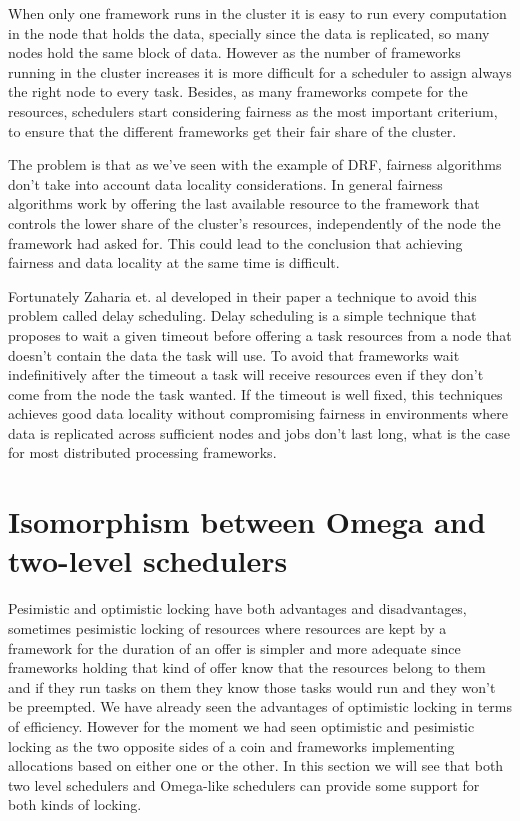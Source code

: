 \documentclass{report}                     %
\begin{document}
When only one framework runs in the cluster it is easy to run every
computation in the node that holds the data, specially since the data
is replicated, so many nodes hold the same block of data. However as
the number of frameworks running in the cluster increases it is more
difficult for a scheduler to assign always the right node to every
task. Besides, as many frameworks compete for the resources, schedulers
start considering fairness as the most important criterium, to ensure
that the different frameworks get their fair share of the cluster.

The problem is that as we've seen with the example of DRF, fairness
algorithms don't take into account data locality considerations. In
general fairness algorithms work by offering the last available
resource to the framework that controls the lower share of the cluster's
resources, independently of the node the framework had asked for. This
could lead to the conclusion that achieving fairness and data locality
at the same time is difficult.

Fortunately Zaharia et. al developed in their paper
\cite{zaharia_delay_2010} a technique to avoid this problem called
delay scheduling. Delay scheduling is a simple technique that proposes
to wait a given timeout before offering a task resources from a node
that doesn't contain the data the task will use. To avoid that
frameworks wait indefinitively after the timeout a task will receive
resources even if they don't come from the node the task wanted. If
the timeout is well fixed, this techniques achieves good data locality
without compromising fairness in environments where data is replicated
across sufficient nodes and jobs don't last long, what is the case for
most distributed processing frameworks.



\section {Isomorphism between Omega and two-level schedulers}
\label{sec:mixed}

Pesimistic and optimistic locking have both advantages and
disadvantages, sometimes pesimistic locking of resources where
resources are kept by a framework for the duration of an offer is
simpler and more adequate since frameworks holding that kind of offer
know that the resources belong to them and if they run tasks on them
they know those tasks would run and they won't be preempted. We have
already seen the advantages of optimistic locking in terms of
efficiency. However for the moment we had seen optimistic and
pesimistic locking as the two opposite sides of a coin and frameworks
implementing allocations based on either one or the other. In this
section we will see that both two level schedulers and Omega-like
schedulers can provide some support for both kinds of locking.
\end{document}
